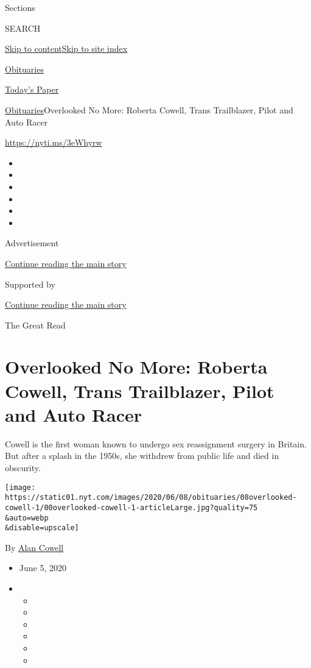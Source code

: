 Sections

SEARCH

\protect\hyperlink{site-content}{Skip to
content}\protect\hyperlink{site-index}{Skip to site index}

\href{https://www.nytimes.com/section/obituaries}{Obituaries}

\href{https://myaccount.nytimes.com/auth/login?response_type=cookie\&client_id=vi}{}

\href{https://www.nytimes.com/section/todayspaper}{Today's Paper}

\href{/section/obituaries}{Obituaries}\textbar{}Overlooked No More:
Roberta Cowell, Trans Trailblazer, Pilot and Auto Racer

\url{https://nyti.ms/3eWhyrw}

\begin{itemize}
\item
\item
\item
\item
\item
\item
\end{itemize}

Advertisement

\protect\hyperlink{after-top}{Continue reading the main story}

Supported by

\protect\hyperlink{after-sponsor}{Continue reading the main story}

The Great Read

\hypertarget{overlooked-no-more-roberta-cowell-trans-trailblazer-pilot-and-auto-racer}{%
\section{Overlooked No More: Roberta Cowell, Trans Trailblazer, Pilot
and Auto
Racer}\label{overlooked-no-more-roberta-cowell-trans-trailblazer-pilot-and-auto-racer}}

Cowell is the first woman known to undergo sex reassignment surgery in
Britain. But after a splash in the 1950s, she withdrew from public life
and died in obscurity.

\texttt{[image: https://static01.nyt.com/images/2020/06/08/obituaries/08overlooked-cowell-1/00overlooked-cowell-1-articleLarge.jpg?quality=75\\\&auto=webp\\\&disable=upscale]}

By \href{https://www.nytimes.com/by/alan-cowell}{Alan Cowell}

\begin{itemize}
\item
  June 5, 2020
\item
  \begin{itemize}
  \item
  \item
  \item
  \item
  \item
  \item
  \end{itemize}
\end{itemize}

